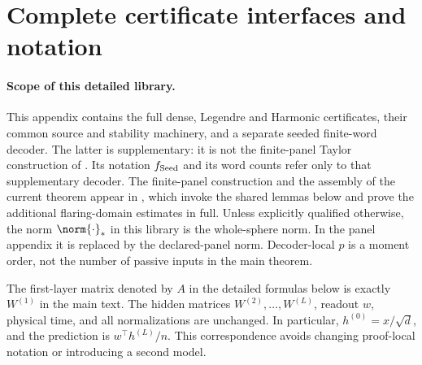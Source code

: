 \providecommand{\inttablemath}[1]{\begingroup
  \setbox0=\hbox{$\textstyle #1$}%
  \ifdim\wd0>\linewidth\typeout{INTTABLE:\the\inputlineno:\the\wd0:\the\linewidth}\fi
  \ifdim\wd0>\linewidth\resizebox{\linewidth}{!}{\box0}\else\box0\fi
  \endgroup}
\providecommand{\intdisplay}[1]{\begingroup
  \setbox0=\hbox{$\displaystyle #1$}%
  \dimen0=\dimexpr\linewidth-5em\relax
  \ifdim\wd0>\dimen0\typeout{INTDISPLAY:\theHequation:\the\wd0:\the\dimen0}\fi
  \ifdim\wd0>\dimen0\resizebox{\dimen0}{!}{\box0}\else\box0\fi
  \endgroup}
\clearpage


\section{Complete certificate interfaces and notation}
\label{int:headline-results}

\paragraph{Scope of this detailed library.}
This appendix contains the full dense, Legendre and Harmonic certificates,
their common source and stability machinery, and a separate seeded
finite-word decoder. The latter is supplementary: it is not the finite-panel
Taylor construction of . Its notation
$f_{\rm Seed}$ and its word counts refer only to that supplementary decoder.
The finite-panel construction and the assembly of the current theorem appear in
, which invoke the shared
lemmas below and prove the additional flaring-domain estimates in full.
Unless explicitly qualified otherwise, the norm $\norm{\cdot}_*$ in this
library is the whole-sphere norm. In the panel appendix it is replaced by
the declared-panel norm. Decoder-local $p$ is a moment order, not the
number of passive inputs in the main theorem.


The first-layer matrix denoted by \(A\) in the detailed formulas below is
exactly \(W^{(1)}\) in the main text. The hidden matrices
\(W^{(2)},\ldots,W^{(L)}\), readout \(w\), physical time, and all
normalizations are unchanged. In particular, \(h^{(0)}=x/\sqrt d\),
and the prediction is \(w^\top h^{(L)}/n\). This correspondence avoids
changing proof-local notation or introducing a second model.

